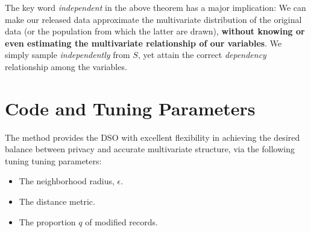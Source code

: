 \documentclass[11pt]{article}
\begin{document}
\bigskip

The key word {\it independent} in the above theorem has a major
implication:  We can make our released data approximate the multivariate
distribution of the original data (or the population from which the
latter are drawn), {\bf without knowing or even estimating the
multivariate relationship of our variables}.  We simply sample {\it
independently} from $S$, yet attain the correct {\it dependency}
relationship among the variables.





\section{Code and Tuning Parameters}

The method provides the DSO with excellent flexibility in achieving the
desired balance between privacy and accurate multivariate structure, via
the following tuning tuning parameters:

\begin{itemize}

\item The neighborhood radius, $\epsilon$.

\item The distance metric.

\item The proportion $q$ of modified records.  

\end{itemize}
\end{document}
